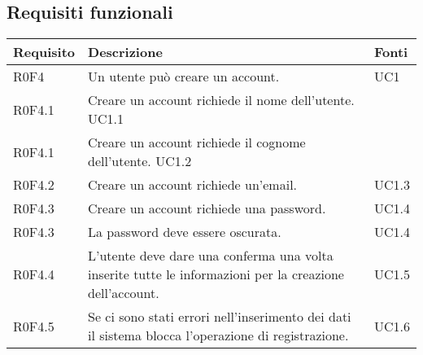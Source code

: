 \subsection{Requisiti funzionali}
\begin{center}
\begin{longtable}{|p{3cm}|p{8cm}|p{3cm}|}
\hline
\rowcolor{lighter-grayer}
\textbf{Requisito} & \textbf{Descrizione}  & \textbf{Fonti} \\ \hline
 R0F4 & Un utente può creare un account. &  UC1 \\ \hline
 R0F4.1 & Creare un account richiede il nome dell'utente.  UC1.1 \\ \hline
 R0F4.1 & Creare un account richiede il cognome dell'utente.  UC1.2 \\ \hline
 R0F4.2 & Creare un account richiede un’email. & UC1.3 \\ \hline
 R0F4.3 & Creare un account richiede una password. & UC1.4 \\ \hline
 R0F4.3 & La password deve essere oscurata. & UC1.4 \\ \hline
 R0F4.4 & L’utente deve dare una conferma una volta inserite tutte le informazioni per la creazione dell’account.& UC1.5 \\ \hline
 R0F4.5 & Se ci sono stati errori nell’inserimento dei dati il sistema blocca l’operazione di registrazione. &UC1.6 \\ \hline



\end{longtable}
\end{center}
